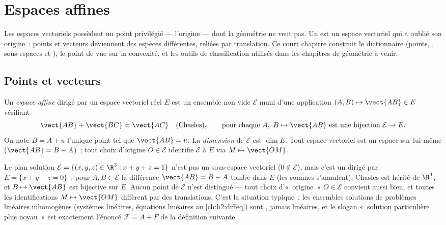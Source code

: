 \chapter{Espaces affines}\label{ch:b2:affine}

Les espaces vectoriels possèdent un point privilégié --- l'origine ---
dont la géométrie ne veut pas. Un \emph{} est un espace
vectoriel qui a oublié son origine~: points et vecteurs deviennent des
espèces différentes, reliées par translation. Ce court chapitre
construit le dictionnaire (points, , sous-espaces et
), le point de vue  sur la convexité, et les
outils de classification utilisés dans les chapitres de géométrie à
venir.

\section{Points et vecteurs}

\begin{definition}\label{def:b2:affine:def}
Un \emph{espace affine} dirigé par un espace
vectoriel réel $E$ est un ensemble non vide $\mathcal{E}$ muni d'une
application $(A, B) \mapsto \vect{AB} \in E$ vérifiant
\[
\vect{AB} + \vect{BC} = \vect{AC}
\quad \text{(Chasles)},
\qquad
\text{pour chaque } A,\ B \mapsto \vect{AB} \text{ est une bijection }
\mathcal{E} \to E .
\]
On note $B = A + u$ l'unique point tel que $\vect{AB} = u$. La
\emph{dimension} de $\mathcal{E}$ est $\dim E$. Tout espace vectoriel
est un espace  sur lui-même ($\vect{AB} = B - A$)~; tout choix
d'origine $O \in \mathcal{E}$ identifie $\mathcal{E}$ à $E$ via $M
\mapsto \vect{OM}$.
\end{definition}

\begin{example}\label{ex:b2:affine:planeexample}
Le plan solution $\mathcal E = \{(x, y, z) \in \R^3 : x + y
+ z = 1\}$ n'est pas un sous-espace vectoriel ($0 \notin \mathcal E$),
mais c'est un  dirigé par $E = \{x + y + z =
0\}$~: pour $A, B \in \mathcal E$ la différence $\vect{AB} = B
- A$ tombe dans $E$ (les sommes s'annulent), Chasles est hérité
de $\R^3$, et $B \mapsto \vect{AB}$ est bijective sur $E$.
Aucun point de $\mathcal E$ n'est distingué --- tout choix
d'«~origine~» $O \in \mathcal E$ convient aussi bien, et toutes les
identifications $M \mapsto \vect{OM}$ diffèrent par des translations.
C'est la situation typique~: les ensembles solutions de problèmes
linéaires inhomogènes (systèmes linéaires, équations 
linéaires au \cref{ch:b2:diffeq}) sont , jamais linéaires,
et le slogan «~solution particulière plus noyau~» est exactement
l'énoncé $\mathcal F = A + F$ de la définition suivante.
\end{example}

